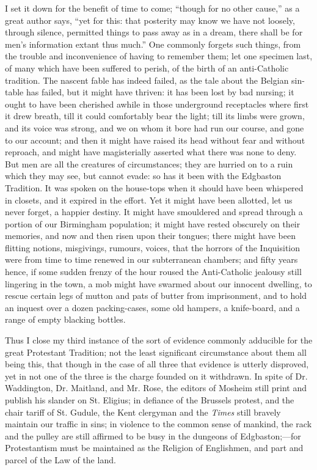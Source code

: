 I set it down for the benefit of time to come;
``though for no other cause,'' as a great author
says, ``yet for this: that posterity may know we have
not loosely, through silence, permitted things to pass
away as in a dream, there shall be for men's information
extant thus much.'' One commonly forgets such things,
from the trouble and inconvenience of having to remember
them; let one specimen last, of many which have been
suffered to perish, of the birth of an anti-Catholic
tradition. The nascent fable has indeed failed, as the
tale about the Belgian sin-table has failed, but it might
have thriven: it has been lost by bad nursing; it ought
to have been cherished awhile in those underground
receptacles where first it drew breath, till it could
comfortably bear the light; till its limbs were grown,
and its voice was strong, and we on whom it bore had run
our course, and gone to our account; and then it might
have raised its head without fear and without reproach,
and might have magisterially asserted what there was none
to deny. But men are all the creatures of circumstances;
they are hurried on to a ruin which they may see, but
cannot evade: so has it been with the Edgbaston
Tradition. It was spoken on the house-tops when it should
have been whispered in closets, and it expired in the
effort. Yet it might have been allotted, let us never
forget, a happier destiny. It might have smouldered and
spread through a portion of our Birmingham population; it
might have rested obscurely on their memories, and now
and then risen upon their tongues; there might have been
flitting notions, misgivings, rumours, voices, that the
horrors of the Inquisition were from time to time renewed
in our subterranean chambers; and fifty years hence, if
some sudden frenzy of the hour roused the Anti-Catholic
jealousy still lingering in the town, a mob might have
swarmed about our innocent dwelling, to rescue certain
legs of mutton and pats of butter from imprisonment, and
to hold an inquest over a dozen packing-cases, some old
hampers, a knife-board, and a range of empty blacking
bottles.

Thus I close my third instance of the sort of evidence
commonly adducible for the great Protestant Tradition;
not the least significant circumstance about them all
being this, that though in the case of all three that
evidence is utterly disproved, yet in not one of the
three is the charge founded on it withdrawn. In spite of
Dr. Waddington, Dr. Maitland, and Mr. Rose, the editors
of Mosheim still print and publish his slander on St.
Eligius; in defiance of the Brussels protest, and the
chair tariff of St. Gudule, the Kent clergyman and the \emph{Times}
still bravely maintain our traffic in sins; in violence
to the common sense of mankind, the rack and the pulley
are still affirmed to be busy in the dungeons of
Edgbaston;—for Protestantism must be maintained as
the Religion of Englishmen, and part and parcel of the
Law of the land.

